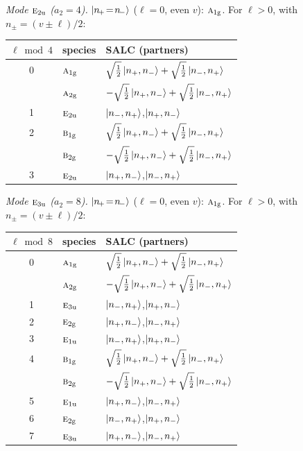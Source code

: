\documentclass[11pt]{article}
\newcommand{\irr}[1]{\text{\normalfont\scshape #1}}
\newcommand{\ptag}[1]{\mathrm{#1}}
\begin{document}
\emph{Mode $\irr{e}_{2\ptag{u}}$ ($a_2=4$).} $\ket{n_{\!+}\!=\!n_{\!-}}$ ($\ell=0$, even $v$): $\irr{a}_{1\ptag{g}}$. For $\ell>0$, with $n_\pm=(v\pm\ell)/2$:
\begin{longtable}{c l l}\hline $\ell\bmod 4$ & species & SALC (partners)\\ \hline\endhead
0 & $\irr{a}_{1\ptag{g}}$ & $\sqrt{\tfrac{1}{2}}\ket{n_+,n_-}+\sqrt{\tfrac{1}{2}}\ket{n_-,n_+}$\\
 & $\irr{a}_{2\ptag{g}}$ & $-\sqrt{\tfrac{1}{2}}\ket{n_+,n_-}+\sqrt{\tfrac{1}{2}}\ket{n_-,n_+}$\\
1 & $\irr{e}_{2\ptag{u}}$ & $\ket{n_-,n_+}$,\quad $\ket{n_+,n_-}$\\
2 & $\irr{b}_{1\ptag{g}}$ & $\sqrt{\tfrac{1}{2}}\ket{n_+,n_-}+\sqrt{\tfrac{1}{2}}\ket{n_-,n_+}$\\
 & $\irr{b}_{2\ptag{g}}$ & $-\sqrt{\tfrac{1}{2}}\ket{n_+,n_-}+\sqrt{\tfrac{1}{2}}\ket{n_-,n_+}$\\
3 & $\irr{e}_{2\ptag{u}}$ & $\ket{n_+,n_-}$,\quad $\ket{n_-,n_+}$\\
\hline\end{longtable}

\emph{Mode $\irr{e}_{3\ptag{u}}$ ($a_2=8$).} $\ket{n_{\!+}\!=\!n_{\!-}}$ ($\ell=0$, even $v$): $\irr{a}_{1\ptag{g}}$. For $\ell>0$, with $n_\pm=(v\pm\ell)/2$:
\begin{longtable}{c l l}\hline $\ell\bmod 8$ & species & SALC (partners)\\ \hline\endhead
0 & $\irr{a}_{1\ptag{g}}$ & $\sqrt{\tfrac{1}{2}}\ket{n_+,n_-}+\sqrt{\tfrac{1}{2}}\ket{n_-,n_+}$\\
 & $\irr{a}_{2\ptag{g}}$ & $-\sqrt{\tfrac{1}{2}}\ket{n_+,n_-}+\sqrt{\tfrac{1}{2}}\ket{n_-,n_+}$\\
1 & $\irr{e}_{3\ptag{u}}$ & $\ket{n_-,n_+}$,\quad $\ket{n_+,n_-}$\\
2 & $\irr{e}_{2\ptag{g}}$ & $\ket{n_+,n_-}$,\quad $\ket{n_-,n_+}$\\
3 & $\irr{e}_{1\ptag{u}}$ & $\ket{n_-,n_+}$,\quad $\ket{n_+,n_-}$\\
4 & $\irr{b}_{1\ptag{g}}$ & $\sqrt{\tfrac{1}{2}}\ket{n_+,n_-}+\sqrt{\tfrac{1}{2}}\ket{n_-,n_+}$\\
 & $\irr{b}_{2\ptag{g}}$ & $-\sqrt{\tfrac{1}{2}}\ket{n_+,n_-}+\sqrt{\tfrac{1}{2}}\ket{n_-,n_+}$\\
5 & $\irr{e}_{1\ptag{u}}$ & $\ket{n_+,n_-}$,\quad $\ket{n_-,n_+}$\\
6 & $\irr{e}_{2\ptag{g}}$ & $\ket{n_-,n_+}$,\quad $\ket{n_+,n_-}$\\
7 & $\irr{e}_{3\ptag{u}}$ & $\ket{n_+,n_-}$,\quad $\ket{n_-,n_+}$\\
\hline\end{longtable}
\end{document}

